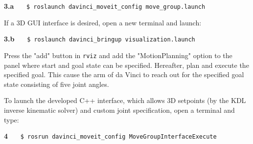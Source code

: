 \hspace{1cm} \textbf{3.a} \ \ \  \texttt{\$ roslaunch davinci\_moveit\_config move\_group.launch} \ \ \ {} 

If a 3D GUI interface is desired, open a new terminal and launch:

\hspace{1cm} \textbf{3.b} \ \ \  \texttt{\$ roslaunch davinci\_bringup visualization.launch} \ \ \ {} 

Press the "add" button in \texttt{rviz} and add the "MotionPlanning" option to the panel where start and goal state can be specified. Hereafter, plan and execute the specified goal. This cause the arm of da Vinci to reach out for the specified goal state consisting of five joint angles.

To launch the developed C++ interface, which allows 3D setpoints (by the KDL inverse kinematic solver) and custom joint specification, open a terminal and type:

\hspace{1cm} \textbf{4} \ \ \  \texttt{\$ rosrun davinci\_moveit\_config MoveGroupInterfaceExecute} \ \ \ {\color{RoyalBlue}{\textit{}}} 

